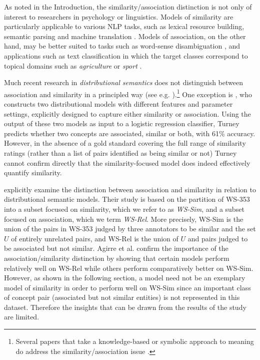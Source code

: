 \documentclass[fullname]{clv2}
\begin{document}
As noted in the Introduction, the similarity/association distinction is not only of interest to researchers in psychology or linguistics. Models of similarity are particularly applicable to various NLP tasks, such as lexical resource building, semantic parsing and machine translation \cite{he2008indirect,Haghighi2008Learning,marton2009improved,beltagysemantic}. Models of association, on the other hand, may be better suited to tasks such as word-sense disambiguation \cite{navigli2009word}, and applications such as text classification \cite{phan2008learning} in which the target classes correspond to topical domains such as \emph{agriculture} or \emph{sport} \cite{rose2002reuters}. 

Much recent research in \emph{distributional semantics} does not distinguish between association and similarity in a principled way (see e.g. \cite{huang2012improving,reisinger2010multi,luong2013better}).\footnote{Several papers that take a knowledge-based or symbolic approach to meaning do address the similarity/association issue \cite{budanitsky2006evaluating}.} One exception is , who constructs two distributional models with different features and parameter settings, explicitly designed to capture either similarity or association. Using the output of these two models as input to a logistic regression classifier, Turney predicts whether two concepts are associated, similar or both, with 61\% accuracy. However, in the absence of a gold standard covering the full range of similarity ratings (rather than a list of pairs identified as being similar or not) Turney cannot confirm directly that the similarity-focused model does indeed effectively quantify similarity. 

 explicitly examine the distinction between association and similarity in relation to distributional semantic models. Their study is based on the partition of WS-353 into a subset focused on similarity, which we refer to as \emph{WS-Sim}, and a subset focused on association, which we term \emph{WS-Rel}. More precisely, WS-Sim is the union of the pairs in WS-353 judged by three annotators to be similar and the set \(U\) of entirely unrelated pairs, and WS-Rel is the union of \(U\) and pairs judged to be associated but not similar. Agirre et al. confirm the importance of the association/similarity distinction by showing that certain models perform relatively well on WS-Rel while others perform comparatively better on WS-Sim. However, as shown in the following section, a model need not be an exemplary model of similarity in order to perform well on WS-Sim since an important class of concept pair (associated but not similar entities) is not represented in this dataset. Therefore the insights that can be drawn from the results of the  study are limited.  
\end{document}
